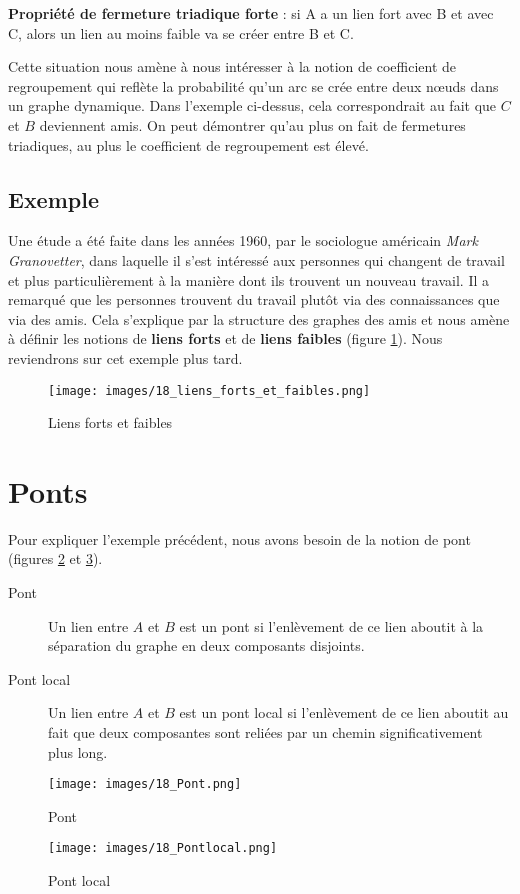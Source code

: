 \textbf{Propriété de fermeture triadique forte} : si A a un lien fort avec B et avec C, alors un lien au moins faible va se créer entre B et C.

Cette situation nous amène à nous intéresser à la notion de coefficient de regroupement qui reflète la probabilité qu'un arc se crée entre deux n\oe uds dans un graphe dynamique. 
Dans l'exemple ci-dessus, cela correspondrait au fait que $C$ et $B$ deviennent amis. On peut démontrer qu'au plus on fait de fermetures triadiques, au plus le coefficient de regroupement est élevé.

\subsection*{Exemple}
Une étude a été faite dans les années 1960, par le sociologue américain \textit{Mark Granovetter}, dans laquelle il s'est intéressé aux personnes qui changent de travail et plus particulièrement à la manière dont ils trouvent un nouveau travail. Il a remarqué que les personnes trouvent du travail plutôt via des connaissances que via des amis. Cela s'explique par la structure des graphes des amis et nous amène à définir les notions de \textbf{liens forts} et de \textbf{liens faibles} (figure \ref{liens_forts_et_faibles}). Nous reviendrons sur cet exemple plus tard.

	\begin{figure}[!h]
	\center
	\texttt{[image: images/18\_liens\_forts\_et\_faibles.png]}
	\caption{\label{liens_forts_et_faibles} Liens forts et faibles}
	\end{figure}

    
\section{Ponts}
Pour expliquer l'exemple précédent, nous avons besoin de la notion de pont (figures \ref{Pont} et \ref{Pontlocal}).
	\begin{description}
	\item[Pont] Un lien entre $A$ et $B$ est un pont si l'enlèvement de ce lien aboutit à la séparation du graphe en deux composants disjoints.
    \item[Pont local] Un lien entre $A$ et $B$ est un pont local si l'enlèvement de ce lien aboutit au fait que deux composantes sont reliées par un chemin significativement plus long.
    \end{description}
    
    \begin{figure}[ht]
    \center
    \texttt{[image: images/18\_Pont.png]}
    \caption{\label{Pont} Pont}
    \end{figure}
    
    \begin{figure}[ht]
    \center
    \texttt{[image: images/18\_Pontlocal.png]}
    \caption{\label{Pontlocal} Pont local}
    \end{figure}
